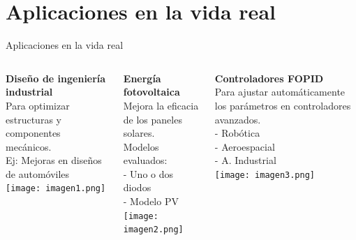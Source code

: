 \documentclass[12pt]{beamer}
\begin{document}
\section{Aplicaciones en la vida real}
\begin{frame}{Aplicaciones en la vida real}
  \begin{columns}[T] 
    \begin{column}{0.33\textwidth}
      \textbf{\small Diseño de ingeniería industrial} \\
      \footnotesize Para optimizar estructuras y componentes mecánicos. \\
      \footnotesize Ej: Mejoras en diseños de automóviles \\
      \vspace{0.5em}
      \texttt{[image: imagen1.png]} 
    \end{column}
    
 
    \begin{column}{0.33\textwidth}
      \textbf{\small Energía fotovoltaica} \\
      \footnotesize Mejora la eficacia de los paneles solares. \\
      \footnotesize Modelos evaluados: \\
      \footnotesize - Uno o dos diodos \\
      \footnotesize - Modelo PV \\
      \vspace{0.5em}
      \texttt{[image: imagen2.png]} 
    \end{column}
    

    \begin{column}{0.33\textwidth}
      \textbf{\small Controladores FOPID} \\
      \footnotesize Para ajustar automáticamente los parámetros en controladores avanzados.\\
      \footnotesize - Robótica \\
      \footnotesize - Aeroespacial \\
      \footnotesize - A. Industrial \\
      \vspace{0.5em}
      \texttt{[image: imagen3.png]} 
    \end{column}
  \end{columns}
\end{frame}
\end{document}
